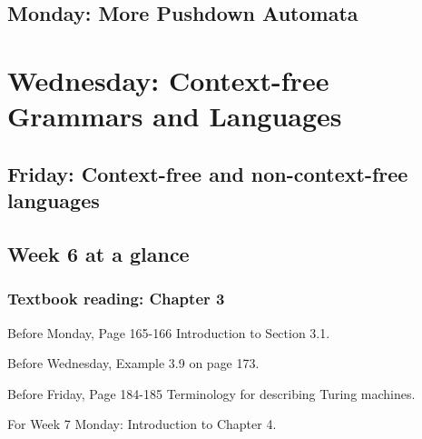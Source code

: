 \newpage



\newpage
\subsection*{Monday: More Pushdown Automata}



\newpage
\section*{Wednesday: Context-free Grammars and Languages}


    
\newpage
\subsection*{Friday: Context-free and non-context-free languages}






\newpage

\subsection*{Week 6 at a glance}

\vspace{-10pt}

\subsubsection*{Textbook reading: Chapter 3}

\vspace{-10pt}

Before Monday, Page 165-166 Introduction to Section 3.1.

\vspace{-10pt}

Before Wednesday, Example 3.9 on page 173.

\vspace{-10pt}

Before Friday, Page 184-185 Terminology for describing Turing machines.

\vspace{-10pt}

For Week 7 Monday: Introduction to Chapter 4.

\vspace{-20pt}

